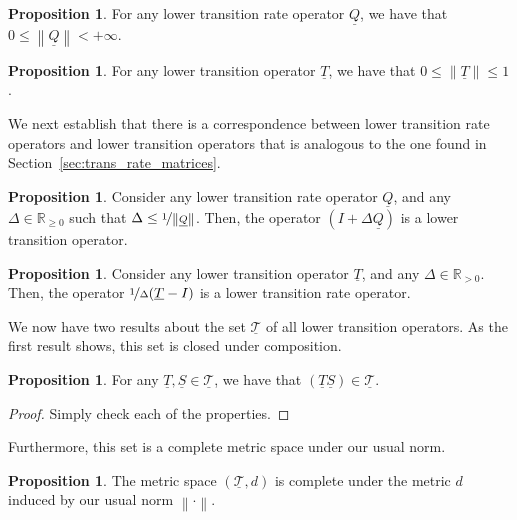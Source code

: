 \documentclass[10pt]{paper}
\theoremstyle{definition}
\newtheorem{proposition}[theorem]{Proposition}
\newcommand{\reals}{\mathbb{R}}
\newcommand{\realspos}{\reals_{>0}}
\newcommand{\realsnonneg}{\reals_{\geq 0}}
\newcommand{\lt}{\underline{T}}
\newcommand{\lrate}{\underline{Q}}
\newcommand{\norm}[1]{\left\lVert #1 \right\rVert}
\begin{document}
\begin{proposition}\label{lem:normlratefinite}
For any lower transition rate operator $\lrate$, we have that $0\leq\norm{\lrate}<+\infty$.
\end{proposition}

\begin{proposition}\label{lemma:normofcoherenttrans}
For any lower transition operator $\lt$, we have that $0\leq \norm{\lt}\leq 1$.
\end{proposition}

We next establish that there is a correspondence between lower transition rate operators and lower transition operators that is analogous to the one found in Section~\ref{sec:trans_rate_matrices}.

\begin{proposition}\label{lemma:normQsmallenough}
Consider any lower transition rate operator $\lrate$, and any $\Delta\in\realsnonneg$ such that $\Delta\leq\nicefrac{1}{\norm{\lrate}}$. Then, the operator $(I+\Delta\lrate)$ is a lower transition operator.
\end{proposition}

\begin{proposition}\label{lemma:lower_trans_to_lower_rate}
Consider any lower transition operator $\lt$, and any $\Delta\in\realspos$. Then, the operator $\nicefrac{1}{\Delta}(\lt - I)$ is a lower transition rate operator.
\end{proposition}

We now have two results about the set $\underline{\mathcal{T}}$ of all lower transition operators. As the first result shows, this set is closed under composition.
\begin{proposition}\label{lemma:compositioncoherence}
For any $\lt,\underline{S}\in\underline{\mathcal{T}}$, we have that $\left(\lt\underline{S}\right)\in\underline{\mathcal{T}}$.
\end{proposition}
\begin{proof}
Simply check each of the properties.
\end{proof}

\noindent Furthermore, this set is a complete metric space under our usual norm.

\begin{proposition}\label{lemma:completemetricspace}
The metric space $(\underline{\mathcal{T}},d)$ is complete under the metric $d$ induced by our usual norm $\norm{\cdot}$.
\end{proposition}
\end{document}
